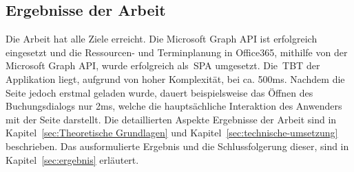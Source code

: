     \subsection{Ergebnisse der Arbeit}\label{subsec:ergebnisse-der-arbeit}
Die Arbeit hat alle Ziele erreicht.
    Die Microsoft Graph API ist erfolgreich eingesetzt und die Ressourcen- und Terminplanung in Office365, mithilfe von der Microsoft Graph API, wurde erfolgreich als~\gls{SPA} umgesetzt.
Die~\gls{TBT} der Applikation liegt, aufgrund von hoher Komplexität, bei ca. 500ms.
    Nachdem die Seite jedoch erstmal geladen wurde, dauert beispielsweise das Öffnen des Buchungsdialogs nur 2ms, welche die hauptsächliche Interaktion des Anwenders mit der Seite darstellt.
    \newline
Die detaillierten Aspekte Ergebnisse der Arbeit sind in Kapitel~\ref{sec:Theoretische Grundlagen} und Kapitel~\ref{sec:technische-umsetzung} beschrieben.
Das ausformulierte Ergebnis und die Schlussfolgerung dieser, sind in Kapitel~\ref{sec:ergebnis} erläutert.
\newpage

